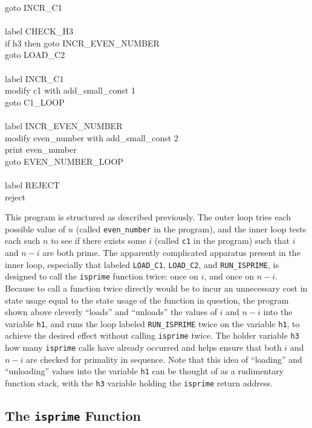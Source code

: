 \documentclass[11pt]{report}
\begin{document}
{\indent \indent	goto INCR\_C1 \\ \\
\indent \indent	label CHECK\_H3 \\
\indent \indent	if h3 then goto INCR\_EVEN\_NUMBER \\
\indent \indent	goto LOAD\_C2 \\ \\
\indent \indent	label INCR\_C1 \\
\indent \indent	modify c1 with add\_small\_const 1 \\
\indent \indent	goto C1\_LOOP \\ \\
\indent	label INCR\_EVEN\_NUMBER \\
\indent	modify even\_number with add\_small\_const 2 \\
\indent	print even\_number \\
\indent	goto EVEN\_NUMBER\_LOOP \\ \\
label REJECT \\
reject \\ 
}		

This program is structured as described previously. The outer loop tries each possible value of $n$ (called \texttt{even\_number} in the program), and the inner loop tests each such $n$ to see if there exists some $i$ (called \texttt{c1} in the program) such that $i$ and $n-i$ are both prime. The apparently complicated apparatus present in the inner loop, especially that labeled \texttt{LOAD\_C1}, \texttt{LOAD\_C2}, and \texttt{RUN\_ISPRIME}, is designed to call the \texttt{isprime} function twice: once on $i$, and once on $n-i$. Because to call a function twice directly would be to incur an unnecessary cost in state usage equal to the state usage of the function in question, the program shown above cleverly ``loads'' and ``unloads'' the values of $i$ and $n-i$ into the variable \texttt{h1}, and runs the loop labeled \texttt{RUN\_ISPRIME} twice on the variable \texttt{h1}, to achieve the desired effect without calling \texttt{isprime} twice. The holder variable \texttt{h3} how many \texttt{isprime} calls have already occurred and helps ensure that both $i$ and $n-i$ are checked for primality in sequence. Note that this idea of ``loading'' and ``unloading'' values into the variable \texttt{h1} can be thought of as a rudimentary function stack, with the \texttt{h3} variable holding the \texttt{isprime} return address. 

\subsection{The \texttt{isprime} Function \label{sec:functionfilegoldbach}}
\end{document}
